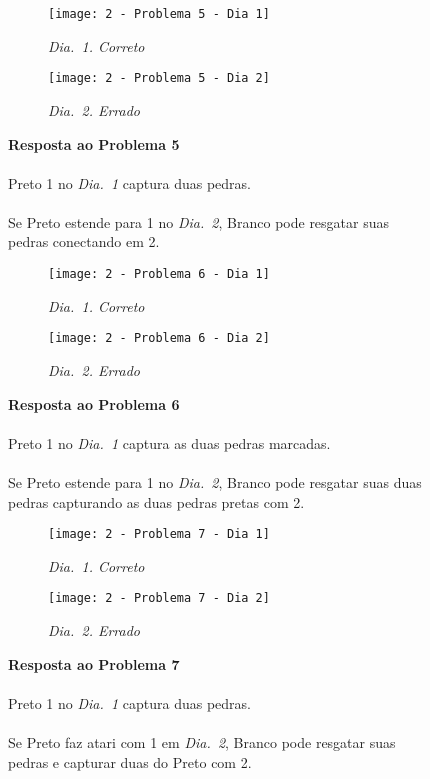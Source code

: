 \vfill

\begin{SCfigure}[][h!]
    \begin{subfigure}[t]{.31\textwidth}
        \texttt{[image: 2 - Problema 5 - Dia 1]}
        \caption*{\emph{Dia.\@~1. Correto}}
    \end{subfigure}
    \hfill
    \begin{subfigure}[t]{.31\textwidth}
        \texttt{[image: 2 - Problema 5 - Dia 2]}
        \caption*{\emph{Dia.\@~2. Errado}}
    \end{subfigure}
    \hfill
    \caption*{\textbf{Resposta ao Problema 5}\\\\Preto 1 no \emph{Dia.\@~1} captura duas pedras.\\\\Se Preto estende para 1 no \emph{Dia.\@~2}, Branco pode resgatar suas pedras conectando em 2.}
\end{SCfigure}

\vfill

\begin{SCfigure}[][h!]
    \begin{subfigure}[t]{.31\textwidth}
        \texttt{[image: 2 - Problema 6 - Dia 1]}
        \caption*{\emph{Dia.\@~1. Correto}}
    \end{subfigure}
    \hfill
    \begin{subfigure}[t]{.31\textwidth}
        \texttt{[image: 2 - Problema 6 - Dia 2]}
        \caption*{\emph{Dia.\@~2. Errado}}
    \end{subfigure}
    \hfill
    \caption*{\textbf{Resposta ao Problema 6}\\\\Preto 1 no \emph{Dia.\@~1} captura as duas pedras marcadas.\\\\Se Preto estende para 1 no \emph{Dia.\@~2}, Branco pode resgatar suas duas pedras capturando as duas pedras pretas com 2.}
\end{SCfigure}

\pagebreak

\begin{SCfigure}[][h!]
    \begin{subfigure}[t]{.31\textwidth}
        \texttt{[image: 2 - Problema 7 - Dia 1]}
        \caption*{\emph{Dia.\@~1. Correto}}
    \end{subfigure}
    \hfill
    \begin{subfigure}[t]{.31\textwidth}
        \texttt{[image: 2 - Problema 7 - Dia 2]}
        \caption*{\emph{Dia.\@~2. Errado}}
    \end{subfigure}
    \hfill
    \caption*{\textbf{Resposta ao Problema 7}\\\\Preto 1 no \emph{Dia.\@~1} captura duas pedras.\\\\Se Preto faz atari com 1 em \emph{Dia.\@~2}, Branco pode resgatar suas pedras e capturar duas do Preto com 2.}
\end{SCfigure}


